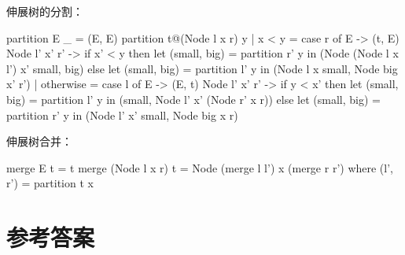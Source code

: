 \documentclass[b5paper]{ctexart}
\begin{document}
伸展树的分割：

\begin{Haskell}
partition E _ = (E, E)
partition t@(Node l x r) y
    | x < y =
        case r of
          E -> (t, E)
          Node l' x' r' ->
              if x' < y then
                  let (small, big) = partition r' y in
                  (Node (Node l x l') x' small, big)
              else
                  let (small, big) = partition l' y in
                  (Node l x small, Node big x' r')
    | otherwise =
        case l of
          E -> (E, t)
          Node l' x' r' ->
              if y < x' then
                  let (small, big) = partition l' y in
                  (small, Node l' x' (Node r' x r))
              else
                  let (small, big) = partition r' y in
                  (Node l' x' small, Node big x r)
\end{Haskell}

伸展树合并：

\begin{Haskell}
merge E t = t
merge (Node l x r) t = Node (merge l l') x (merge r r')
    where (l', r') = partition t x
\end{Haskell}

\ifx\wholebook\relax \else
\section{参考答案}
\shipoutAnswer
\end{document}
